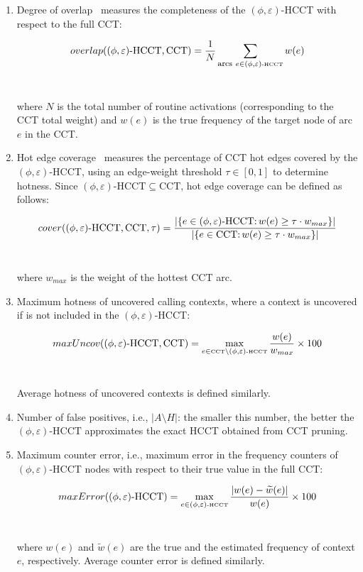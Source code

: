\begin{enumerate}
\item Degree of overlap~\cite{Arnold01,Arnold00,Zhuang06} measures the completeness of the $(\phi,\varepsilon)$-HCCT with respect to the full CCT:
\begin{small}
$$overlap((\phi,\varepsilon){\mbox{-HCCT,\,CCT}})=\frac{1}{N}\sum_{\mbox{\footnotesize{arcs}}~e\in (\phi,\varepsilon)\mbox{\tiny -HCCT}}w(e)$$\\
\end{small}
where $N$ is the total number of routine activations (corresponding to the CCT total weight) and $w(e)$ is the true frequency of the target node of arc $e$ in the CCT.

\item Hot edge coverage~\cite{Zhuang06} measures the percentage of CCT hot edges covered by the $(\phi,\varepsilon)$-HCCT, using an edge-weight threshold $\tau\in [0,1]$ to determine hotness. Since $(\phi,\varepsilon)$-HCCT$\subseteq$CCT, hot edge coverage can be defined as follows:
\begin{small}
$$\hspace{-0mm}cover((\phi,\varepsilon){\mbox{-HCCT,\,CCT}},\tau)=\frac{|\{e\in(\phi,\varepsilon){\mbox{-HCCT:}}\,w(e)\ge\tau \cdot w_{max}\}|}{|\{e\in\mbox{CCT:}\,w(e)\ge\tau \cdot w_{max}\}|}$$\\
\end{small}
where $w_{max}$ is the weight of the hottest CCT arc.

\item Maximum hotness of uncovered calling contexts, where a context is uncovered if is not included in the $(\phi,\varepsilon)$-HCCT:
\begin{small}
$$maxUncov((\phi,\varepsilon){\mbox{-HCCT,\,CCT}})=\max_{e\in\mbox{\tiny CCT}\setminus(\phi,\varepsilon){\mbox{\tiny -HCCT}}}\frac{w(e)}{w_{max}}\times 100$$\\
\end{small}
Average hotness of uncovered contexts is defined similarly.

\item Number of false positives, i.e., $|A\setminus H|$: the smaller this number, the better the $(\phi,\varepsilon){\mbox{-HCCT}}$ approximates the exact HCCT obtained from CCT pruning.

\item Maximum counter error, i.e., maximum error in the frequency counters of $(\phi,\varepsilon)$-HCCT nodes with respect to their true value in the full CCT:
\begin{small}
$$maxError((\phi,\varepsilon){\mbox{-HCCT}})=\max_{e\in(\phi,\varepsilon){\mbox{\tiny -HCCT}}}\frac{|w(e)-\widetilde{w}(e)|}{w(e)}\times 100$$\\
\end{small}
where $w(e)$ and $\widetilde{w}(e)$ are the true and the estimated frequency of context $e$, respectively. Average counter error is defined similarly.
\end{enumerate}

